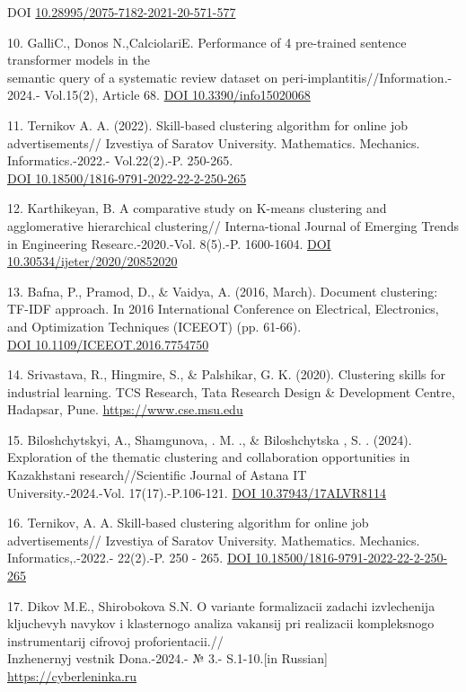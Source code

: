 \begin{references}
DOI
\href{http://dx.doi.org/10.28995/2075-7182-2021-20-571-577}{10.28995/2075-7182-2021-20-571-577}

10. GalliC., Donos N.,CalciolariE. Performance of 4 pre-trained sentence
transformer models in the \\semantic query of a systematic review
dataset on peri-implantitis//Information.- 2024.- Vol.15(2), Article
68. \href{https://doi.org/10.3390/info15020068}{DOI
10.3390/info15020068}

11. Ternikov A. A. (2022). Skill-based clustering algorithm for online job
advertisements// Izvestiya of Saratov University. Mathematics.
Mechanics. Informatics.-2022.- Vol.22(2).-P. 250-265.
\\\href{https://doi.org/10.18500/1816-9791-2022-22-2-250-265}{DOI
10.18500/1816-9791-2022-22-2-250-265}

12. Karthikeyan, B. A comparative study on K-means clustering and
agglomerative hierarchical clustering// Interna-tional Journal of
Emerging Trends in Engineering Researc.-2020.-Vol. 8(5).-P. 1600-1604.
\href{https://doi.org/10.30534/ijeter/2020/20852020}{DOI
\\10.30534/ijeter/2020/20852020}

13. Bafna, P., Pramod, D., \& Vaidya, A. (2016, March). Document
clustering: TF-IDF approach. In 2016 International Conference on
Electrical, Electronics, and Optimization Techniques (ICEEOT) (pp.
61-66). \\\href{https://doi.org/10.1109/ICEEOT.2016.7754750}{DOI
10.1109/ICEEOT.2016.7754750}

14. Srivastava, R., Hingmire, S., \& Palshikar, G. K. (2020). Clustering
skills for industrial learning. TCS Research, Tata Research Design \&
Development Centre, Hadapsar, Pune.
\href{https://www.cse.msu.edu/~wangzh65/AI4EDU/papers/15.pdf}{https://www.cse.msu.edu}

15. Biloshchytskyi, A., Shamgunova, . M. ., \& Biloshchytska , S. .
(2024). Exploration of the thematic clustering and collaboration
opportunities in Kazakhstani research//Scientific Journal of Astana IT
\\University.-2024.-Vol. 17(17).-P.106-121.
\href{https://doi.org/10.37943/17ALVR8114}{DOI 10.37943/17ALVR8114}

16. Ternikov, A. A. Skill-based clustering algorithm for online job
advertisements// Izvestiya of Saratov University. Mathematics.
Mechanics. Informatics,.-2022.- 22(2).-P. 250 - 265.
\href{https://doi.org/10.18500/1816-9791-2022-22-2-250-265}{DOI
10.18500/1816-9791-2022-22-2-250-265}

17. Dikov M.E., Shirobokova S.N. O variante formalizacii zadachi
izvlechenija kljuchevyh navykov i klasternogo analiza vakansij pri
realizacii kompleksnogo instrumentarij cifrovoj proforientacii.//
\\Inzhenernyj vestnik Dona.-2024.- № 3.- S.1-10.{[}in Russian{]}
\href{https://cyberleninka.ru/article/n/o-variante-formalizatsii-zadachi-izvlecheniya-klyuchevyh-navykov-i-klasternogo-analiza-vakansiy-pri-realizatsii-kompleksnogo}{https://cyberleninka.ru}
\end{references}

